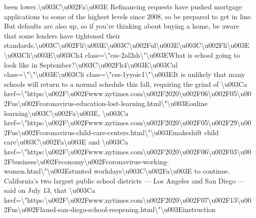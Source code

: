 been
lower.\textbackslash{}u003C\textbackslash{}u002Fa\textbackslash{}u003E
Refinancing requests have pushed mortgage applications to some of the
highest levels since 2008, so be prepared to get in line. But defaults
are also up, so if you're thinking about buying a home, be aware that
some lenders have tightened their
standards.\textbackslash{}u003C\textbackslash{}u002Fli\textbackslash{}u003E\textbackslash{}u003C\textbackslash{}u002Ful\textbackslash{}u003E\textbackslash{}u003C\textbackslash{}u002Fli\textbackslash{}u003E\textbackslash{}u003Cli\textbackslash{}u003E\textbackslash{}u003Ch4
class=\textbackslash{}"css-2al2sh\textbackslash{}"\textbackslash{}u003EWhat
is school going to look like in
September?\textbackslash{}u003C\textbackslash{}u002Fh4\textbackslash{}u003E\textbackslash{}u003Cul
class=\textbackslash{}"\textbackslash{}"\textbackslash{}u003E\textbackslash{}u003Cli
class=\textbackslash{}"css-1yyoic1\textbackslash{}"\textbackslash{}u003EIt
is unlikely that many schools will return to a normal schedule this
fall, requiring the grind of \textbackslash{}u003Ca
href=\textbackslash{}"https:\textbackslash{}u002F\textbackslash{}u002Fwww.nytimes.com\textbackslash{}u002F2020\textbackslash{}u002F06\textbackslash{}u002F05\textbackslash{}u002Fus\textbackslash{}u002Fcoronavirus-education-lost-learning.html\textbackslash{}"\textbackslash{}u003Eonline
learning\textbackslash{}u003C\textbackslash{}u002Fa\textbackslash{}u003E,
\textbackslash{}u003Ca
href=\textbackslash{}"https:\textbackslash{}u002F\textbackslash{}u002Fwww.nytimes.com\textbackslash{}u002F2020\textbackslash{}u002F05\textbackslash{}u002F29\textbackslash{}u002Fus\textbackslash{}u002Fcoronavirus-child-care-centers.html\textbackslash{}"\textbackslash{}u003Emakeshift
child
care\textbackslash{}u003C\textbackslash{}u002Fa\textbackslash{}u003E and
\textbackslash{}u003Ca
href=\textbackslash{}"https:\textbackslash{}u002F\textbackslash{}u002Fwww.nytimes.com\textbackslash{}u002F2020\textbackslash{}u002F06\textbackslash{}u002F03\textbackslash{}u002Fbusiness\textbackslash{}u002Feconomy\textbackslash{}u002Fcoronavirus-working-women.html\textbackslash{}"\textbackslash{}u003Estunted
workdays\textbackslash{}u003C\textbackslash{}u002Fa\textbackslash{}u003E
to continue. California's two largest public school districts --- Los
Angeles and San Diego --- said on July 13, that \textbackslash{}u003Ca
href=\textbackslash{}"https:\textbackslash{}u002F\textbackslash{}u002Fwww.nytimes.com\textbackslash{}u002F2020\textbackslash{}u002F07\textbackslash{}u002F13\textbackslash{}u002Fus\textbackslash{}u002Flausd-san-diego-school-reopening.html\textbackslash{}"\textbackslash{}u003Einstruction
